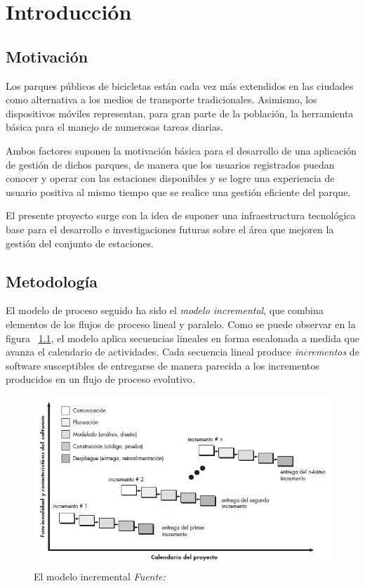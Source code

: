 \chapter{Introducción}

\section{Motivación}

Los parques públicos de bicicletas están cada vez más extendidos en las ciudades como alternativa a los medios de transporte tradicionales. Asimismo, los dispositivos móviles representan, para gran parte de la población, la herramienta básica para el manejo de numerosas tareas diarias.

Ambos factores suponen la motivación básica para el desarrollo de una aplicación de gestión de dichos parques, de manera que los usuarios registrados puedan conocer y operar con las estaciones disponibles y se logre una experiencia de usuario positiva al mismo tiempo que se realice una gestión eficiente del parque.

El presente proyecto surge con la idea de suponer una infraestructura tecnológica base para el desarrollo e investigaciones futuras sobre el área que mejoren la gestión del conjunto de estaciones.

\section{Metodología}

El modelo de proceso seguido ha sido el \emph{modelo incremental}, que combina elementos de los flujos de proceso lineal y paralelo. Como se puede observar en la figura ~\ref{fig:procesoIncremental}, el modelo aplica secuencias lineales en forma escalonada a medida que avanza el calendario de actividades. Cada secuencia lineal produce \emph{incrementos} de software susceptibles de entregarse de manera parecida a los incrementos producidos en un flujo de proceso evolutivo.

\begin{figure}
	\centering
	\includegraphics[width=\linewidth,height=\textheight,keepaspectratio]{Images/ModeloIncremental}
	\caption{El modelo incremental \textit{Fuente:~\cite{Pre10}}}
	\label{fig:procesoIncremental}
\end{figure}

